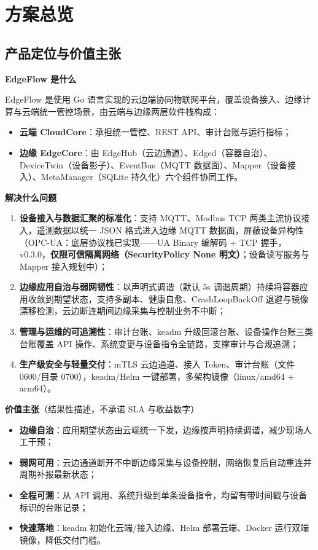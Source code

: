 \chapter{方案总览}

\section{产品定位与价值主张}

\textbf{EdgeFlow 是什么}

EdgeFlow 是使用 Go 语言实现的云边端协同物联网平台，覆盖设备接入、边缘计算与云端统一管控场景，由云端与边缘两层软件栈构成：

\begin{itemize}
  \item \textbf{云端 CloudCore}：承担统一管控、REST API、审计台账与运行指标；
  \item \textbf{边缘 EdgeCore}：由 EdgeHub（云边通道）、Edged（容器自治）、DeviceTwin（设备影子）、EventBus（MQTT 数据面）、Mapper（设备接入）、MetaManager（SQLite 持久化）六个组件协同工作。
\end{itemize}

\textbf{解决什么问题}

\begin{enumerate}
  \item \textbf{设备接入与数据汇聚的标准化}：支持 MQTT、Modbus TCP 两类主流协议接入，遥测数据以统一 JSON 格式进入边缘 MQTT 数据面，屏蔽设备异构性（OPC-UA：底层协议栈已实现——UA Binary 编解码 + TCP 握手，v0.3.0，\textbf{仅限可信隔离网络（SecurityPolicy None 明文）}；设备读写服务与 Mapper 接入规划中）；
  \item \textbf{边缘应用自治与弱网韧性}：以声明式调谐（默认 5s 调谐周期）持续将容器应用收敛到期望状态，支持多副本、健康自愈、CrashLoopBackOff 退避与镜像漂移检测，云边断连期间边缘采集与控制业务不中断；
  \item \textbf{管理与运维的可追溯性}：审计台账、keadm 升级回滚台账、设备操作台账三类台账覆盖 API 操作、系统变更与设备指令全链路，支撑审计与合规追溯；
  \item \textbf{生产级安全与轻量交付}：mTLS 云边通道、接入 Token、审计台账（文件 0600/目录 0700），keadm/Helm 一键部署，多架构镜像（linux/amd64 + arm64）。
\end{enumerate}

\textbf{价值主张}（结果性描述，不承诺 SLA 与收益数字）

\begin{itemize}
  \item \textbf{边缘自治}：应用期望状态由云端统一下发，边缘按声明持续调谐，减少现场人工干预；
  \item \textbf{弱网可用}：云边通道断开不中断边缘采集与设备控制，网络恢复后自动重连并周期补报最新状态；
  \item \textbf{全程可溯}：从 API 调用、系统升级到单条设备指令，均留有带时间戳与设备标识的台账记录；
  \item \textbf{快速落地}：keadm 初始化云端/接入边缘、Helm 部署云端、Docker 运行双端镜像，降低交付门槛。
\end{itemize}

